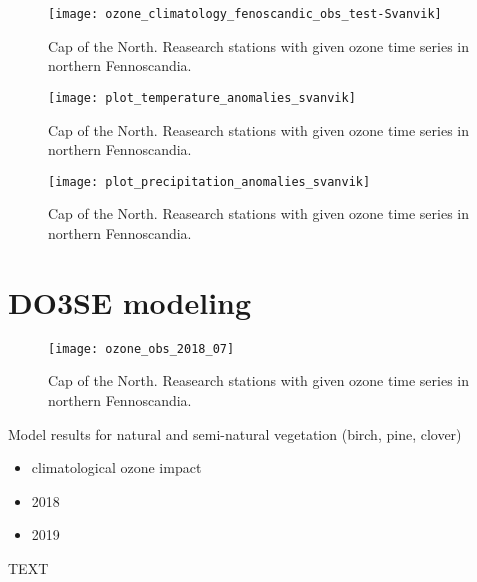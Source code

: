 \documentclass[bg, manuscript]{copernicus}
\begin{document}
\begin{figure}[t]
  \texttt{[image: ozone\_climatology\_fenoscandic\_obs\_test-Svanvik]}
  \label{fig:ozone_climatology_fenoscandic_obs_test-Svanvik}
\caption{Cap of the North. Reasearch stations with given ozone time series in northern Fennoscandia.}
\end{figure}


\begin{figure}[t]
  \texttt{[image: plot\_temperature\_anomalies\_svanvik]}
  \label{fig:plot_temperature_anomalies_svanvik}
\caption{Cap of the North. Reasearch stations with given ozone time series in northern Fennoscandia.}
\end{figure}

\begin{figure}[t]
  \texttt{[image: plot\_precipitation\_anomalies\_svanvik]}
  \label{fig:plot_precipitation_anomalies_svanvik}
\caption{Cap of the North. Reasearch stations with given ozone time series in northern Fennoscandia.}
\end{figure}


\section{DO3SE modeling}
\begin{figure}[t]
  \texttt{[image: ozone\_obs\_2018\_07]}
  \label{fig:ozone_obs_2018_07}
\caption{Cap of the North. Reasearch stations with given ozone time series in northern Fennoscandia.}
\end{figure}
Model results for natural and semi-natural vegetation (birch, pine, clover)
\begin{itemize}
\item climatological ozone impact
\item 2018
\item 2019
\end{itemize}


\conclusions  %
TEXT




\end{document}
